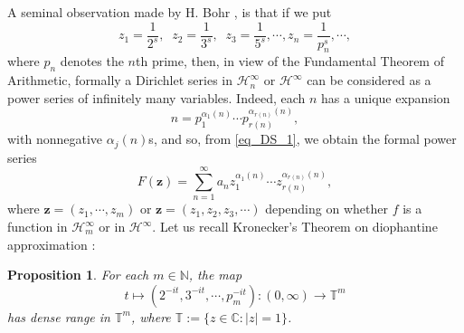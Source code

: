 \documentclass[11pt,reqno]{amsart}
\numberwithin{equation}{section}
\newtheorem{proposition}[theorem]{Proposition}
\theoremstyle{definition}
\theoremstyle{definition}
\theoremstyle{definition}
\begin{document}
A seminal observation made by H. Bohr \cite{Boh}, is that if we
put
$$
z_1= \frac{1}{2^s}, \;\; 
z_2= \frac{1}{3^s}, \;\; 
z_3= \frac{1}{5^s}, \cdots, 
z_n= \frac{1}{p_n^s}, \cdots, 
$$
where $p_n$ denotes the $n$th prime, then, in view of the Fundamental
Theorem of Arithmetic, formally a Dirichlet series in
$\mathscr{H}^\infty_n$ or ${{{\mathscr{H}}^{\infty}}}$ can be considered as a power series of
infinitely many variables. Indeed, each $n$ has a unique expansion
$$
n=p_1^{\alpha_1(n)} \cdots p_{r(n)}^{\alpha_{r(n)}(n)},
$$
with nonnegative $\alpha_j(n)$s, and so, from \eqref{eq_DS_1}, we obtain the
formal power series
\begin{equation}
 \label{eq_formal_cap_F}
F(\mathbf{z})=\sum_{n=1}^\infty a_n z_1^{\alpha_1(n)}\cdots z_{r(n)}^{\alpha_{r(n)}(n)},
\end{equation}
where $\mathbf{z}=(z_1,\cdots, z_m)$ or
$\mathbf{z}=(z_1,z_2,z_3,\cdots)$ depending on whether $f$ is a
function in $ \mathscr{H}^\infty_m$ or in ${{{\mathscr{H}}^{\infty}}}$.  Let us recall  Kronecker's
Theorem on diophantine approximation \cite[Chapter~XXIII]{HarWri}:

\begin{proposition}
For each $m\in {\mathbb{N}}$, the map 
$$
t\mapsto (2^{-it}, 3^{-it}, \cdots, p_m^{-it}):(0,\infty)\rightarrow {\mathbb{T}}^m
$$ 
has dense range in ${\mathbb{T}}^m$, where ${\mathbb{T}}:=\{z\in {\mathbb{C}}:|z|=1\}$. 
\end{proposition}
\end{document}
